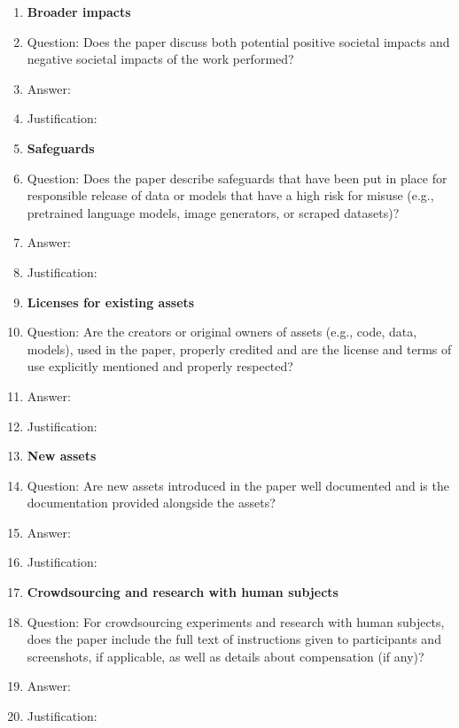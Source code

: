 \documentclass{article}
\begin{document}
\begin{enumerate}
\item {\bf Broader impacts}
    \item[] Question: Does the paper discuss both potential positive societal impacts and negative societal impacts of the work performed?
    \item[] Answer: \answerTODO{} %
    \item[] Justification: \justificationTODO{}

\item {\bf Safeguards}
    \item[] Question: Does the paper describe safeguards that have been put in place for responsible release of data or models that have a high risk for misuse (e.g., pretrained language models, image generators, or scraped datasets)?
    \item[] Answer: \answerTODO{} %
    \item[] Justification: \justificationTODO{}

\item {\bf Licenses for existing assets}
    \item[] Question: Are the creators or original owners of assets (e.g., code, data, models), used in the paper, properly credited and are the license and terms of use explicitly mentioned and properly respected?
    \item[] Answer: \answerTODO{} %
    \item[] Justification: \justificationTODO{}

\item {\bf New assets}
    \item[] Question: Are new assets introduced in the paper well documented and is the documentation provided alongside the assets?
    \item[] Answer: \answerTODO{} %
    \item[] Justification: \justificationTODO{}

\item {\bf Crowdsourcing and research with human subjects}
    \item[] Question: For crowdsourcing experiments and research with human subjects, does the paper include the full text of instructions given to participants and screenshots, if applicable, as well as details about compensation (if any)?
    \item[] Answer: \answerTODO{} %
    \item[] Justification: \justificationTODO{}


\end{enumerate}
\end{document}
